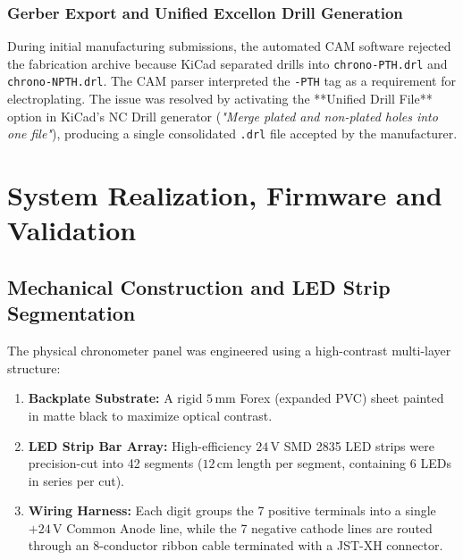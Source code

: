 \documentclass[12pt,a4paper,oneside]{report}
\begin{document}
\subsection{Gerber Export and Unified Excellon Drill Generation}
During initial manufacturing submissions, the automated CAM software rejected the fabrication archive because KiCad separated drills into \texttt{chrono-PTH.drl} and \texttt{chrono-NPTH.drl}. The CAM parser interpreted the \texttt{-PTH} tag as a requirement for electroplating.
The issue was resolved by activating the **Unified Drill File** option in KiCad's NC Drill generator (\textit{"Merge plated and non-plated holes into one file"}), producing a single consolidated \texttt{.drl} file accepted by the manufacturer.

\chapter{System Realization, Firmware and Validation}

\section{Mechanical Construction and LED Strip Segmentation}
The physical chronometer panel was engineered using a high-contrast multi-layer structure:
\begin{enumerate}
    \item \textbf{Backplate Substrate:} A rigid $5\,\text{mm}$ Forex (expanded PVC) sheet painted in matte black to maximize optical contrast.
    \item \textbf{LED Strip Bar Array:} High-efficiency $24\,\text{V}$ SMD 2835 LED strips were precision-cut into 42 segments ($12\,\text{cm}$ length per segment, containing 6 LEDs in series per cut).
    \item \textbf{Wiring Harness:} Each digit groups the 7 positive terminals into a single $+24\,\text{V}$ Common Anode line, while the 7 negative cathode lines are routed through an 8-conductor ribbon cable terminated with a JST-XH connector.
\end{enumerate}
\end{document}
